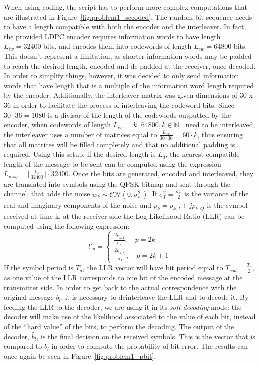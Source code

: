 \documentclass[10pt]{article}
\begin{document}

When using coding, the script has to perform more complex computations that are illustrated in Figure~\ref{fig:problem1_sccoded}. The random bit sequence needs to have a length compatible with both the encoder and the interleaver. In fact, the provided LDPC encoder requires information words to have length $L_{iw} = 32400$ bits, and encodes them into codewords of length $L_{cw} = 64800$ bits. This doesn't represent a limitation, as shorter information words may be padded to reach the desired length, encoded and de-padded at the receiver, once decoded. In order to simplify things, however, it was decided to only send information words that have length that is a multiple of the information word length required by the encoder. Additionally, the interleaver matrix was given dimensions of 30 x 36 in order to facilitate the process of interleaving the codeword bits. Since $30 \cdot 36 = 1080$ is a divisor of the length of the codewords outputted by the encoder, when codewords of length $L_{cw} = k \cdot 64800, k \in \mathbb{N^{+}}$ need to be interleaved, the interleaver uses a number of matrices equal to $\frac{L_{cw}}{30\cdot36} = 60 \cdot k$, thus ensuring that all matrices will be filled completely and that no additional padding is required. Using this setup, if the desired length is $L_d$, the nearest compatible length of the message to be sent can be computed using the expression $L_{msg} = \lceil \frac{L_{d}}{32400} \rceil \cdot 32400$. Once the bits are generated, encoded and interleaved, they are translated into symbols using the QPSK bitmap and sent through the channel, that adds the noise $w_k \sim \mathcal{CN}(0, \sigma_w^2)$. If $\sigma^2_I = \frac{\sigma^2_w}{2}$ is the variance of the real and imaginary components of the noise and $\rho_k = \rho_{k,I} + j \rho_{k,Q}$ is the symbol received at time k, at the receiver side the Log Likelihood Ratio (LLR) can be computed using the following expression:
\begin{equation}
	l'_p =
	\begin{cases}
	\frac{2 \rho_{k,I}}{\sigma_I}, \quad p = 2k \\
	\frac{2 \rho_{k,Q}}{\sigma_I}, \quad p = 2k +1
	\end{cases}
\end{equation}
If the symbol period is $T_a$, the LLR vector will have bit period equal to $T_{cod} = \frac{T_a}{2}$, as one value of the LLR corresponds to one bit of the encoded message at the transmitter side. In order to get back to the actual correspondence with the original message $b_l$, it is necessary to deinterleave the LLR and to decode it. By feeding the LLR to the decoder, we are using it in its \emph{soft decoding} mode: the decoder will make use of the likelihood associated to the value of each bit, instead of the ``hard value'' of the bits, to perform the decoding. %
The output of the decoder, $\hat{b}_l$, is the final decision on the received symbols. This is the vector that is compared to $b_l$ in order to compute the probability of bit error. The results can once again be seen in Figure~\ref{fig:problem1_pbit}. 
\end{document}
